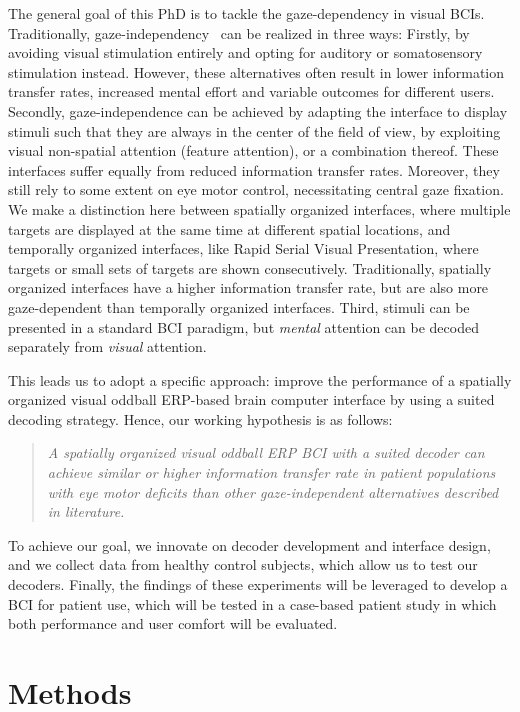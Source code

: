 The general goal of this PhD is to tackle the gaze-dependency in visual BCIs.
Traditionally, gaze-independency~\cite{Riccio2012, Aloise2012} can be realized in three ways:
Firstly, by avoiding visual
stimulation entirely and opting for auditory or somatosensory stimulation instead.
However, these alternatives often result in lower information transfer rates,
increased mental effort and variable outcomes for different users.
Secondly, gaze-independence can
be achieved by adapting the interface to display stimuli such that they
are always in the center of the field of view, by exploiting visual
non-spatial attention (feature attention), or a combination thereof.
These interfaces suffer equally from reduced information transfer rates.
Moreover, they still rely to some extent on eye motor control, necessitating central gaze fixation.
We make a distinction here between spatially organized interfaces, where
multiple targets are displayed at the same time at different spatial locations,
and temporally organized interfaces, like Rapid Serial Visual Presentation,
where targets or small sets of targets are shown consecutively.
Traditionally, spatially organized interfaces have a higher information transfer
rate, but are also more gaze-dependent than temporally organized interfaces.
Third, stimuli can be presented in a standard BCI paradigm, but \emph{mental} attention
can be decoded separately from \emph{visual} attention.

This leads us to adopt a specific approach: improve the performance of a
spatially organized visual oddball ERP-based brain
computer interface by using a suited decoding strategy.
Hence, our working hypothesis is as follows:
\begin{quote}
	\textit{A spatially organized visual oddball ERP BCI with a suited decoder
		can achieve similar or higher information transfer rate in patient
		populations with eye motor deficits than other
		gaze-independent alternatives described in literature.}
\end{quote}

To achieve our goal, we innovate on decoder development and interface design,
and we collect data from healthy control subjects, which allow us to test our decoders.
Finally, the findings of these experiments will be leveraged to develop a BCI
for patient use, which will be tested in a case-based patient study in which
both performance and user comfort will be evaluated.


\section{Methods}

